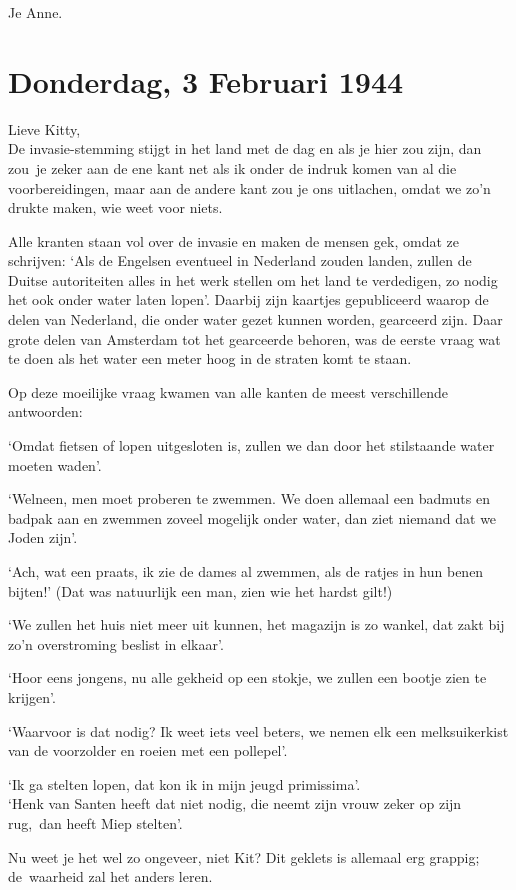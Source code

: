 \documentclass{book}
\begin{document}
Je Anne.

\section*{Donderdag, 3 Februari 1944}

Lieve Kitty,\\
De invasie-stemming stijgt in het land met de dag en als je hier
zou zijn, dan zou~je zeker aan de ene kant net als ik onder de indruk komen van
al die voorbereidingen, maar aan de andere kant zou je ons uitlachen, omdat we
zo'n drukte maken, wie weet voor niets.

Alle kranten staan vol over de invasie en maken de mensen gek, omdat ze
schrijven: `Als de Engelsen eventueel in Nederland zouden landen, zullen de
Duitse autoriteiten alles in het werk stellen om het land te verdedigen, zo
nodig het ook onder water laten lopen'. Daarbij zijn kaartjes gepubliceerd
waarop de delen van Nederland, die onder water gezet kunnen worden, gearceerd
zijn. Daar grote delen van Amsterdam tot het gearceerde behoren, was de eerste
vraag wat te doen als het water een meter hoog in de straten komt te staan.

Op deze moeilijke vraag kwamen van alle kanten de meest verschillende
antwoorden:

`Omdat fietsen of lopen uitgesloten is, zullen we dan door het stilstaande water
moeten waden'.

`Welneen, men moet proberen te zwemmen. We doen allemaal een badmuts en badpak
aan en zwemmen zoveel mogelijk onder water, dan ziet niemand dat we Joden zijn'.

`Ach, wat een praats, ik zie de dames al zwemmen, als de ratjes in hun benen
bijten!' (Dat was natuurlijk een man, zien wie het hardst gilt!)

`We zullen het huis niet meer uit kunnen, het magazijn is zo wankel, dat zakt
bij zo'n overstroming beslist in elkaar'.

`Hoor eens jongens, nu alle gekheid op een stokje, we zullen een bootje zien te
krijgen'.

`Waarvoor is dat nodig? Ik weet iets veel beters, we nemen elk een
melksuikerkist van de voorzolder en roeien met een pollepel'.

`Ik ga stelten lopen, dat kon ik in mijn jeugd primissima'.\\
`Henk van Santen
heeft dat niet nodig, die neemt zijn vrouw zeker op zijn rug,~dan heeft Miep
stelten'.

Nu weet je het wel zo ongeveer, niet Kit? Dit geklets is allemaal erg grappig;
de~waarheid zal het anders leren.
\end{document}

